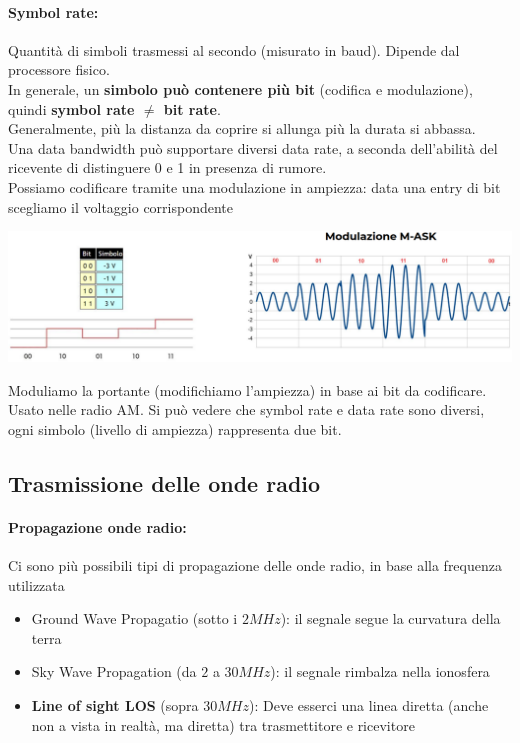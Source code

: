 \paragraph{Symbol rate:} Quantità di simboli trasmessi al secondo (misurato in baud). Dipende dal processore fisico.\\

In generale, un \textbf{simbolo può contenere più bit} (codifica e modulazione), quindi \textbf{symbol rate $\neq$ bit rate}.\\
Generalmente, più la distanza da coprire si allunga più la durata si abbassa.\\

Una data bandwidth può supportare diversi data rate, a seconda dell'abilità del ricevente di distinguere 0 e 1 in presenza di rumore.\\

Possiamo codificare tramite una modulazione in ampiezza: data una entry di bit scegliamo il voltaggio corrispondente
\begin{center}
	\includegraphics[width=\linewidth]{img/wireless/modam1}
\end{center}
Moduliamo la portante (modifichiamo l'ampiezza) in base ai bit da codificare. Usato nelle radio AM. Si può vedere che symbol rate e data rate sono diversi, ogni simbolo (livello di ampiezza) rappresenta due bit.\\

\newpage

\subsection{Trasmissione delle onde radio}

\paragraph{Propagazione onde radio:} Ci sono più possibili tipi di propagazione delle onde radio, in base alla frequenza utilizzata
\begin{itemize}
	\item Ground Wave Propagatio (sotto i $2MHz$): il segnale segue la curvatura della terra
	\item Sky Wave Propagation (da $2$ a $30MHz$): il segnale rimbalza nella ionosfera
	\item \textbf{Line of sight LOS} (sopra $30MHz$): Deve esserci una linea diretta (anche non a vista in realtà, ma diretta) tra trasmettitore e ricevitore
\end{itemize}


